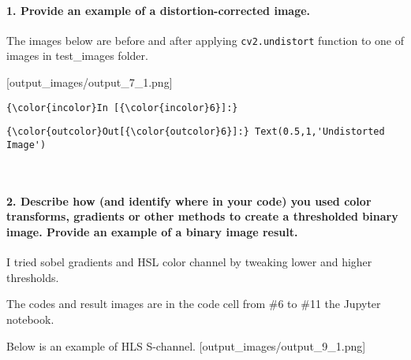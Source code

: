 \documentclass[11pt]{article}
\begin{document}
\hypertarget{provide-an-example-of-a-distortion-corrected-image.}{%
\paragraph{1. Provide an example of a distortion-corrected
image.}\label{provide-an-example-of-a-distortion-corrected-image.}}

The images below are before and after applying \texttt{cv2.undistort}
function to one of images in test\_images folder.

{[}output\_images/output\_7\_1.png{]}

    \begin{Verbatim}[commandchars=\\\{\}]
{\color{incolor}In [{\color{incolor}6}]:} 
\end{Verbatim}


\begin{Verbatim}[commandchars=\\\{\}]
{\color{outcolor}Out[{\color{outcolor}6}]:} Text(0.5,1,'Undistorted Image')
\end{Verbatim}
            
    \begin{center}
    \end{center}
    { \hspace*{\fill} \\}
    
    \hypertarget{describe-how-and-identify-where-in-your-code-you-used-color-transforms-gradients-or-other-methods-to-create-a-thresholded-binary-image.-provide-an-example-of-a-binary-image-result.}{%
\paragraph{2. Describe how (and identify where in your code) you used
color transforms, gradients or other methods to create a thresholded
binary image. Provide an example of a binary image
result.}\label{describe-how-and-identify-where-in-your-code-you-used-color-transforms-gradients-or-other-methods-to-create-a-thresholded-binary-image.-provide-an-example-of-a-binary-image-result.}}

I tried sobel gradients and HSL color channel by tweaking lower and
higher thresholds.

The codes and result images are in the code cell from \#6 to \#11 the
Jupyter notebook.

Below is an example of HLS S-channel.
{[}output\_images/output\_9\_1.png{]}
\end{document}

